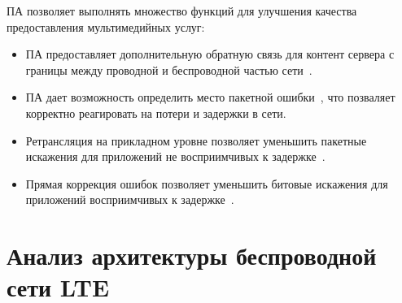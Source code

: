 ПА позволяет выполнять множество функций для улучшения качества предоставления мультимедийных услуг:
\begin{itemize}
\item ПА предоставляет дополнительную обратную связь для контент сервера с границы между проводной  и беспроводной частью сети \cite{SAdouble_feedback}.
\item ПА дает возможность определить место пакетной ошибки \cite{SAdouble_feedback}, что позваляет корректно реагировать на потери и задержки в сети.
\item Ретрансляция на прикладном уровне позволяет уменьшить  пакетные искажения  для приложений не восприимчивых к задержке \cite{SArateOpt, SArealtime}.
\item Прямая коррекция ошибок позволяет уменьшить битовые искажения для приложений восприимчивых к задержке \cite{SArateOpt, SArealtime}.
\end{itemize}






\section{Анализ архитектуры беспроводной сети LTE} \label{sect1_3}
